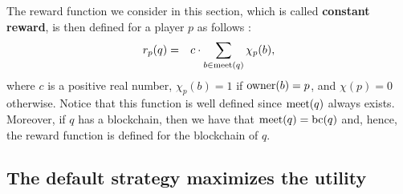 \documentclass[a4paper,english,cleveref, autoref,numberwithinsect]{lipics-v2019}
\newcommand{\bchain}{\text{bc}}
\newcommand{\owner}{\text{\rm owner}}
\newcommand{\bP}{\mathbf{P}}
\newcommand{\bB}{\mathbf{B}}
\newcommand{\meet}{\text{\rm meet}}
\begin{document}
The reward function we consider in this section, which is called \textbf{constant reward}, is then defined for a player $p$ as follows : 
%
%
\begin{eqnarray*}
r_p(q) & = & 
{\displaystyle c \cdot \sum_{b \in \meet(q)} \chi_p(b),}
\end{eqnarray*}
where $c$ is a positive real number, $\chi_p(b) = 1$ if $\owner(b) = p$, and $\chi(p) = 0$ otherwise.
Notice that this function is well defined since $\meet(q)$ always exists. Moreover, if $q$ has a blockchain, then we have that $\meet(q) = \bchain(q)$ and, hence, the reward function is defined for the blockchain of $q$.
 
 \subsection{The default strategy maximizes the utility}
\end{document}
